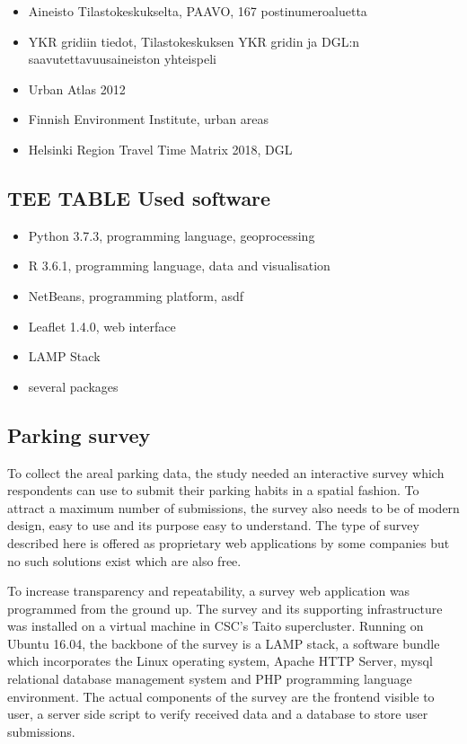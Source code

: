 \begin{itemize}
    \item Aineisto Tilastokeskukselta, PAAVO, 167 postinumeroaluetta
    \item YKR gridiin tiedot, Tilastokeskuksen YKR gridin ja DGL:n saavutettavuusaineiston yhteispeli
    \item Urban Atlas 2012
    \item Finnish Environment Institute, urban areas
    \item Helsinki Region Travel Time Matrix 2018, DGL
\end{itemize}

\subsection{TEE TABLE Used software}
\justify

\begin{itemize}
    \item Python 3.7.3, programming language, geoprocessing
    \item R 3.6.1, programming language, data and visualisation
    \item NetBeans, programming platform, asdf
    \item Leaflet 1.4.0, web interface
    \item LAMP Stack
    \item several packages
\end{itemize}

\subsection{Parking survey}
\justify
To collect the areal parking data, the study needed an interactive survey which respondents can use to submit their parking habits in a spatial fashion. To attract a maximum number of submissions, the survey also needs to be of modern design, easy to use and its purpose easy to understand. The type of survey described here is offered as proprietary web applications by some companies but no such solutions exist which are also free. 

To increase transparency and repeatability, a survey web application was programmed from the ground up. The survey and its supporting infrastructure was installed on a virtual machine in CSC's Taito supercluster. Running on Ubuntu 16.04, the backbone of the survey is a LAMP stack, a software bundle which incorporates the Linux operating system, Apache HTTP Server, \gls{mysql} relational database management system and PHP programming language environment. The actual components of the survey are the frontend visible to user, a server side script to verify received data and a database to store user submissions. 

